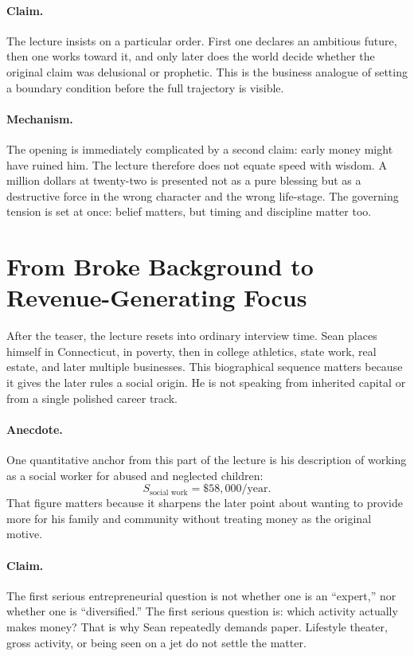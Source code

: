 \paragraph{Claim.}
The lecture insists on a particular order. First one declares an ambitious future, then one works toward it, and only later does the world decide whether the original claim was delusional or prophetic. This is the business analogue of setting a boundary condition before the full trajectory is visible.

\paragraph{Mechanism.}
The opening is immediately complicated by a second claim: early money might have ruined him. The lecture therefore does not equate speed with wisdom. A million dollars at twenty-two is presented not as a pure blessing but as a destructive force in the wrong character and the wrong life-stage. The governing tension is set at once: belief matters, but timing and discipline matter too.

\section{From Broke Background to Revenue-Generating Focus}

After the teaser, the lecture resets into ordinary interview time. Sean places himself in Connecticut, in poverty, then in college athletics, state work, real estate, and later multiple businesses. This biographical sequence matters because it gives the later rules a social origin. He is not speaking from inherited capital or from a single polished career track.

\paragraph{Anecdote.}
One quantitative anchor from this part of the lecture is his description of working as a social worker for abused and neglected children:
\begin{equation}
S_{\text{social work}} = \$58{,}000/\text{year}.
\end{equation}
That figure matters because it sharpens the later point about wanting to provide more for his family and community without treating money as the original motive.

\paragraph{Claim.}
The first serious entrepreneurial question is not whether one is an ``expert,'' nor whether one is ``diversified.'' The first serious question is: which activity actually makes money? That is why Sean repeatedly demands paper. Lifestyle theater, gross activity, or being seen on a jet do not settle the matter.

